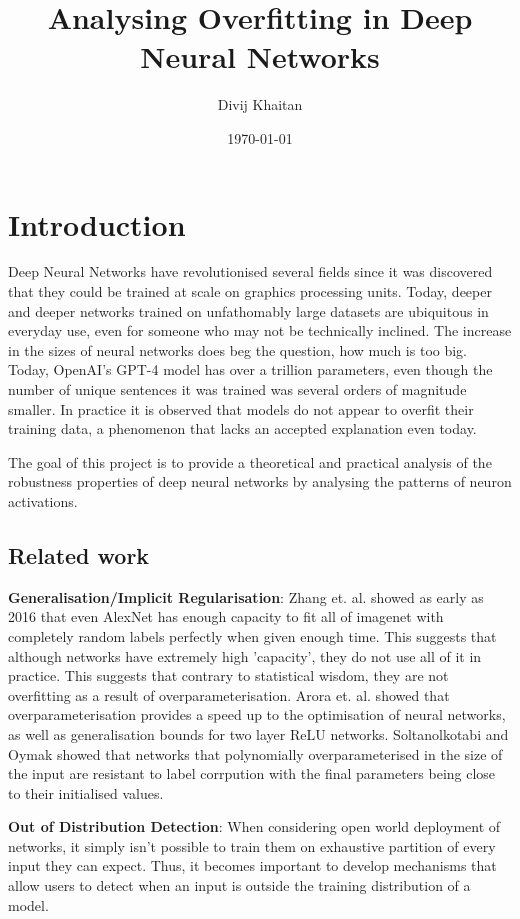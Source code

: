 \documentclass{article}
\title{Analysing Overfitting in Deep Neural Networks}
\author{Divij Khaitan}
\date{\today}
\begin{document}
    \maketitle

    \section{Introduction}
        Deep Neural Networks have revolutionised several fields since it was discovered that they could be trained at scale on graphics processing units. Today, deeper and deeper networks trained on unfathomably large datasets are ubiquitous in everyday use, even for someone who may not be technically inclined. The increase in the sizes of neural networks does beg the question, how much is too big. Today, OpenAI's GPT-4 model has over a trillion parameters, even though the number of unique sentences it was trained was several orders of magnitude smaller. In practice it is observed that models do not appear to overfit their training data, a phenomenon that lacks an accepted explanation even today.
        
        The goal of this project is to provide a theoretical and practical analysis of the robustness properties of deep neural networks by analysing the patterns of neuron activations. 
        \subsection{Related work}
            \textbf{Generalisation/Implicit Regularisation}: Zhang et. al. showed as early as 2016 that even AlexNet has enough capacity to fit all of imagenet with completely random labels perfectly when given enough time. This suggests that although networks have extremely high 'capacity', they do not use all of it in practice. This suggests that contrary to statistical wisdom, they are not overfitting as a result of overparameterisation. Arora et. al. showed that overparameterisation provides a speed up to the optimisation of neural networks, as well as generalisation bounds for two layer ReLU networks. Soltanolkotabi and Oymak showed that networks that polynomially overparameterised in the size of the input are resistant to label corrpution with the final parameters being close to their initialised values. 

            \textbf{Out of Distribution Detection}: When considering open world deployment of networks, it simply isn't possible to train them on exhaustive partition of every input they can expect. Thus, it becomes important to develop mechanisms that allow users to detect when an input is outside the training distribution of a model. 
\end{document}
